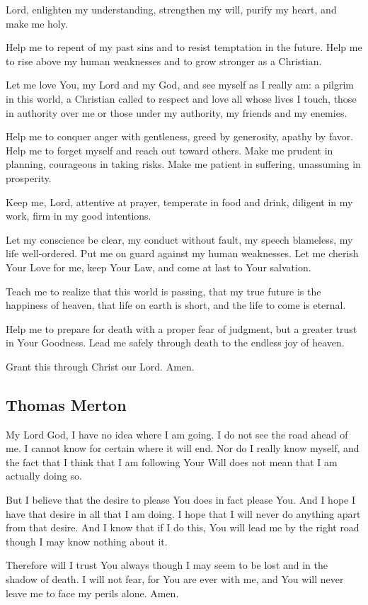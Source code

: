 \documentclass[12pt]{article}
\newcommand{\prayertitle}[1]{\subsection{#1}}
\begin{document}
Lord, enlighten my understanding,
strengthen my will,
purify my heart,
and make me holy.

Help me to repent of my past sins and to resist temptation in the future.
Help me to rise above my human weaknesses and to grow stronger as a Christian.

Let me love You, my Lord and my God, and see myself as I really am:
a pilgrim in this world,
a Christian called to respect and love all whose lives I touch,
those in authority over me or those under my authority,
my friends and my enemies.

Help me to conquer anger with gentleness,
greed by generosity,
apathy by favor.
Help me to forget myself and reach out toward others.
Make me prudent in planning, courageous in taking risks.
Make me patient in suffering, unassuming in prosperity.

Keep me, Lord, attentive at prayer,
temperate in food and drink,
diligent in my work,
firm in my good intentions.

Let my conscience be clear,
my conduct without fault,
my speech blameless,
my life well-ordered.
Put me on guard against my human weaknesses.
Let me cherish Your Love for me,
keep Your Law,
and come at last to Your salvation.

Teach me to realize that this world is passing,
that my true future is the happiness of heaven,
that life on earth is short,
and the life to come is eternal.

Help me to prepare for death with a proper fear of judgment, but a greater trust in Your Goodness.
Lead me safely through death to the endless joy of heaven.

Grant this through Christ our Lord. Amen.

\prayertitle{Thomas Merton}
My Lord God, I have no idea where I am going. 
I do not see the road ahead of me.
I cannot know for certain where it will end.
Nor do I really know myself,  and the fact that I think that I am following Your Will does not mean that I am actually doing so.

But I believe that the desire to please You does in fact please You. 
And I hope I have that desire in all that I am doing. 
I hope that I will never do anything apart from that desire. 
And I know that if I do this, You will lead me by the right road though I may know nothing about it.

Therefore will I trust You always though I may seem to be lost and in the shadow of death.
I will not fear, for You are ever with me, and You will never leave me to face my perils alone. 
Amen.  
\end{document}

